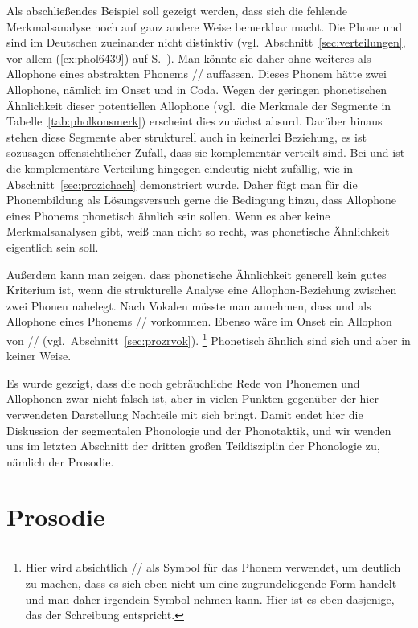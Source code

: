 Als abschließendes Beispiel soll gezeigt werden, dass sich die fehlende Merk\-mals\-ana\-lyse noch auf ganz andere Weise bemerkbar macht.
Die Phone \textipa{[h]} und \textipa{[N]} sind im Deutschen zueinander nicht distinktiv (vgl.\ Abschnitt~\ref{sec:verteilungen}, vor allem (\ref{ex:phol6439}) auf S.~\pageref{ex:phol6439}).
Man könnte sie daher ohne weiteres als Allophone eines abstrakten Phonems // auffassen.
Dieses Phonem hätte zwei Allophone, nämlich \textipa{[h]} im Onset und \textipa{[N]} in Coda.
Wegen der geringen phonetischen Ähnlichkeit dieser potentiellen Allophone (vgl.\ die Merkmale der Segmente in Tabelle~\ref{tab:pholkonsmerk}) erscheint dies zunächst absurd.
Darüber hinaus stehen diese Segmente aber strukturell auch in keinerlei Beziehung, es ist sozusagen offensichtlicher Zufall, dass sie komplementär verteilt sind.
Bei \textipa{[\c{c}]} und \textipa{[X]} ist die komplementäre Verteilung hingegen eindeutig nicht zufällig, wie in Abschnitt~\ref{sec:prozichach} demonstriert wurde.
Daher fügt man für die Phonembildung als Lösungsversuch gerne die Bedingung hinzu, dass Allophone eines Phonems phonetisch ähnlich sein sollen.
Wenn es aber keine Merkmalsanalysen gibt, weiß man nicht so recht, was phonetische Ähnlichkeit eigentlich sein soll.

Außerdem kann man zeigen, dass phonetische Ähnlichkeit generell kein gutes Kriterium ist, wenn die strukturelle Analyse eine Allophon-Beziehung zwischen zwei Phonen nahelegt.
Nach Vokalen müsste man \zB annehmen, dass \textipa{[@]} und \textipa{[5]} als Allophone eines Phonems // vorkommen.
Ebenso wäre im Onset \textipa{[K]} ein Allophon von // (vgl.\ Abschnitt~\ref{sec:prozrvok}).%
\footnote{Hier wird absichtlich // als Symbol für das Phonem verwendet, um deutlich zu machen, dass es sich eben nicht um eine zugrundeliegende Form handelt und man daher irgendein Symbol nehmen kann.
Hier ist es eben dasjenige, das der Schreibung entspricht.}
Phonetisch ähnlich sind sich \textipa{[@]} und \textipa{[K]} aber in keiner Weise.

Es wurde gezeigt, dass die noch gebräuchliche Rede von Phonemen und Allophonen zwar nicht falsch ist, aber in vielen Punkten gegenüber der hier verwendeten Darstellung Nachteile mit sich bringt.
Damit endet hier die Diskussion der segmentalen Phonologie und der Phonotaktik, und wir wenden uns im letzten Abschnitt der dritten großen Teildisziplin der Phonologie zu, nämlich der Prosodie.

\section{Prosodie}

